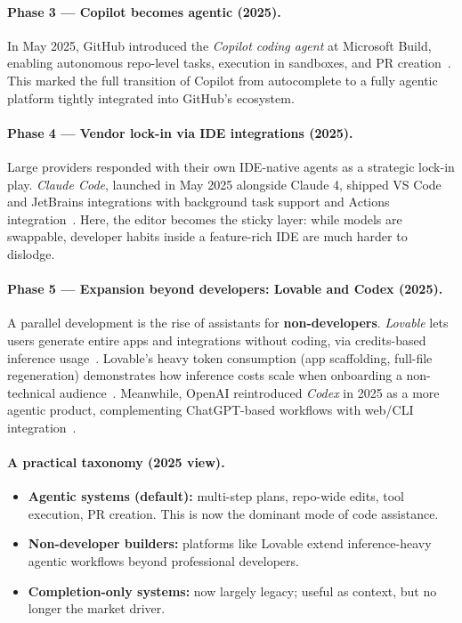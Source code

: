 \documentclass[english]{article}
\begin{document}
\paragraph{Phase 3 — Copilot becomes agentic (2025).}
In May 2025, GitHub introduced the \textit{Copilot coding agent} at Microsoft Build, enabling autonomous repo-level tasks, execution in sandboxes, and PR creation~\cite{github_copilot_agent}.
This marked the full transition of Copilot from autocomplete to a fully agentic platform tightly integrated into GitHub’s ecosystem.

\paragraph{Phase 4 — Vendor lock-in via IDE integrations (2025).}
Large providers responded with their own IDE-native agents as a strategic lock-in play. 
\textit{Claude Code}, launched in May 2025 alongside Claude 4, shipped VS Code and JetBrains integrations with background task support and Actions integration~\cite{claude4_2025,claude_code2025}.
Here, the editor becomes the sticky layer: while models are swappable, developer habits inside a feature-rich IDE are much harder to dislodge.

\paragraph{Phase 5 — Expansion beyond developers: Lovable and Codex (2025).}
A parallel development is the rise of assistants for \textbf{non-developers}. 
\textit{Lovable} lets users generate entire apps and integrations without coding, via credits-based inference usage~\cite{lovable2025}.
Lovable's heavy token consumption (app scaffolding, full-file regeneration) demonstrates how inference costs scale when onboarding a non-technical audience~\cite{lovable_ft}.
Meanwhile, OpenAI reintroduced \textit{Codex} in 2025 as a more agentic product, complementing ChatGPT-based workflows with web/CLI integration~\cite{openai_codex2025,openai_codex_github}.

\paragraph{A practical taxonomy (2025 view).}
\begin{itemize}
  \item \textbf{Agentic systems (default):} multi-step plans, repo-wide edits, tool execution, PR creation. This is now the dominant mode of code assistance.
  \item \textbf{Non-developer builders:} platforms like Lovable extend inference-heavy agentic workflows beyond professional developers.
  \item \textbf{Completion-only systems:} now largely legacy; useful as context, but no longer the market driver.
\end{itemize}
\end{document}
